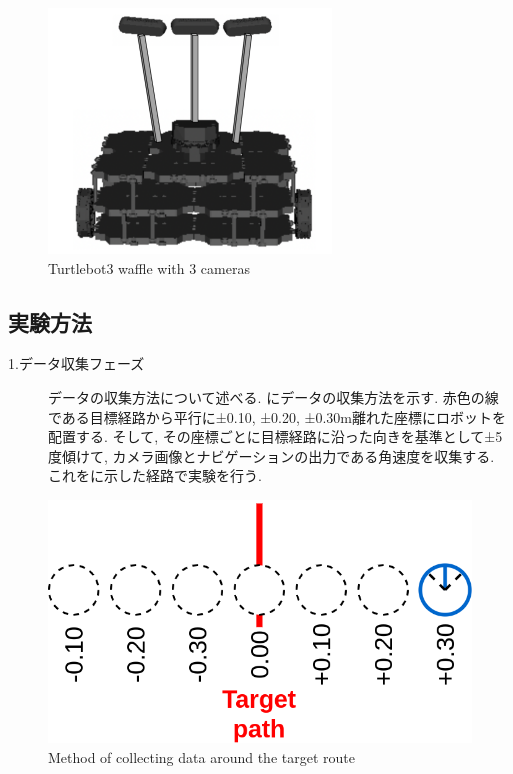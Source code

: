 \begin{figure}[h]
  \centering
  \includegraphics[keepaspectratio, scale=0.55]{images/turtlebot3.png}
  \caption{Turtlebot3 waffle with 3 cameras}
  \label{Fig:turtlebot3}
  \end{figure}

\newpage
\subsection{実験方法}
\begin{description}
  \item[1.データ収集フェーズ]データの収集方法について述べる. にデータの収集方法を示す. 赤色の線である目標経路から平行に±0.10, ±0.20, ±0.30m離れた座標にロボットを配置する. そして, その座標ごとに目標経路に沿った向きを基準として±5度傾けて, カメラ画像とナビゲーションの出力である角速度を収集する. これをに示した経路で実験を行う. 
\end{description}

\begin{figure}[h]
  \centering
  \includegraphics[keepaspectratio, scale=0.25]{images/old-method.png}
  \caption{Method of collecting data around the target route}
  \label{Fig:old-method}
  \end{figure}

